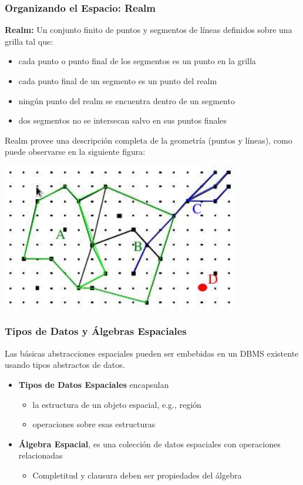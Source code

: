 \documentclass[a4paper,12pt,oneside]{report}
\begin{document}
\subsubsection*{Organizando el Espacio: Realm}
\textbf{Realm:} Un conjunto finito de puntos y segmentos de l\'ineas definidos sobre una grilla tal que:
\begin{small}
\begin{itemize}
\item cada punto o punto final de los segmentos es un punto en la grilla
\item cada punto final de un segmento es un punto del realm
\item ning\'un punto del realm se encuentra dentro de un segmento
\item dos segmentos no se intersecan salvo en sus puntos finales
\end{itemize}
\end{small}
Realm provee una descripci\'on completa de la geometr\'ia (puntos y l\'ineas), como puede observarse en la siguiente figura:
\begin{center}\includegraphics[scale=0.3]{Imagenes/4.png}\end{center}
\begin{small}
\end{small}

\subsubsection*{Tipos de Datos y \'Algebras Espaciales}
Las b\'asicas abstracciones espaciales pueden ser embebidas en un DBMS existente usando tipos abstractos de datos.
\begin{itemize}
\item \textbf{Tipos de Datos Espaciales} encapsulan
\begin{itemize}
\item la estructura de un objeto espacial, e.g., regi\'on
\item operaciones sobre esas estructuras
\end{itemize}
\item \textbf{\'Algebra Espacial}, es una colecci\'on de datos espaciales con operaciones relacionadas
\begin{itemize}
\item Completitud y clausura deben ser propiedades del \'algebra
\end{itemize}
\end{itemize}
\end{document}
